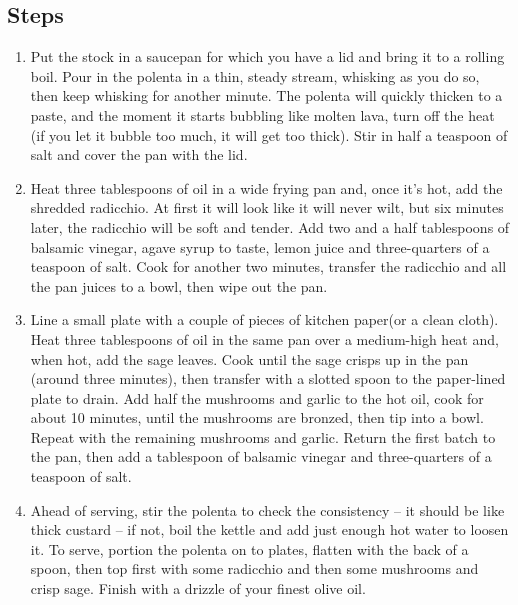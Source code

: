 \documentclass{book}
\begin{document}
\subsection*{Steps}
\begin{enumerate}
\item Put the stock in a saucepan for which you have a lid and bring it to a rolling boil. Pour in the polenta in a thin, steady stream, whisking as you do so, then keep whisking for another minute. The polenta will quickly thicken to a paste, and the moment it starts bubbling like molten lava, turn off the heat (if you let it bubble too much, it will get too thick). Stir in half a teaspoon of salt and cover the pan with the lid.
\item Heat three tablespoons of oil in a wide frying pan and, once it’s hot, add the shredded radicchio. At first it will look like it will never wilt, but six minutes later, the radicchio will be soft and tender. Add two and a half tablespoons of balsamic vinegar, agave syrup to taste, lemon juice and three-quarters of a teaspoon of salt. Cook for another two minutes, transfer the radicchio and all the pan juices to a bowl, then wipe out the pan.
\item Line a small plate with a couple of pieces of kitchen paper(or a clean cloth). Heat three tablespoons of oil in the same pan over a medium-high heat and, when hot, add the sage leaves. Cook until the sage crisps up in the pan (around three minutes), then transfer with a slotted spoon to the paper-lined plate to drain. Add half the mushrooms and garlic to the hot oil, cook for about 10 minutes, until the mushrooms are bronzed, then tip into a bowl. Repeat with the remaining mushrooms and garlic. Return the first batch to the pan, then add a tablespoon of balsamic vinegar and three-quarters of a teaspoon of salt.
\item Ahead of serving, stir the polenta to check the consistency – it should be like thick custard – if not, boil the kettle and add just enough hot water to loosen it. To serve, portion the polenta on to plates, flatten with the back of a spoon, then top first with some radicchio and then some mushrooms and crisp sage. Finish with a drizzle of your finest olive oil.
\end{enumerate}
\newpage
\end{document}
